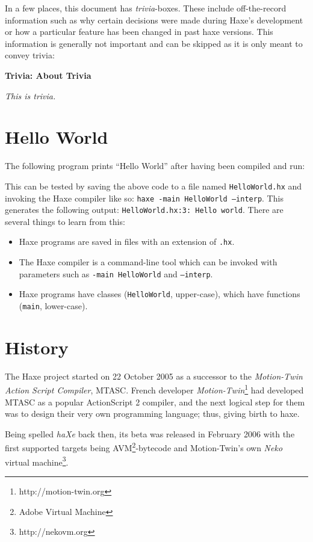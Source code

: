 \documentclass[a4paper,oneside]{book}
\newcommand{\type}[1]{\texttt{#1}}
\newcommand{\expr}[1]{\texttt{#1}}
\newenvironment{myshaded}
  {\def\FrameCommand{\fboxsep=\topsep\colorbox{bgcolor}}%
  \MakeFramed {\advance\hsize-\width \FrameRestore}}%
 {\endMakeFramed}
\newcommand{\trivia}[2]
	{\begin{myshaded}\noindent\textbf{Trivia: #1}\par\nobreak\noindent\ignorespaces\textit{#2}\end{myshaded}}
\newcommand{\ic}[1]{\texttt{#1}}
\newcommand{\haxe}[2][]{%
}
\begin{document}
In a few places, this document has \emph{trivia}-boxes. These include off-the-record information such as why certain decisions were made during Haxe's development or how a particular feature has been changed in past haxe versions. This information is generally not important and can be skipped as it is only meant to convey trivia:

\trivia{About Trivia}{This is trivia.}


\section{Hello World}
\label{introduction-hello-World}

The following program prints ``Hello World'' after having been compiled and run:

\haxe{assets/HelloWorld.hx}
This can be tested by saving the above code to a file named \ic{HelloWorld.hx} and invoking the Haxe compiler like so: \ic{haxe -main HelloWorld --interp}. This generates the following output: \ic{HelloWorld.hx:3: Hello world}. There are several things to learn from this:

\begin{itemize}
	\item Haxe programs are saved in files with an extension of \ic{.hx}.
	\item The Haxe compiler is a command-line tool which can be invoked with parameters such as \ic{-main HelloWorld} and \ic{--interp}.
	\item Haxe programs have classes (\type{HelloWorld}, upper-case), which have functions (\expr{main}, lower-case). 
\end{itemize}

\section{History}
\label{introduction-haxe-history}

The Haxe project started on 22 October 2005 as a successor to the \emph{Motion-Twin Action Script Compiler}, MTASC. French developer \emph{Motion-Twin}\footnote{http://motion-twin.org} had developed MTASC as a popular ActionScript 2 compiler, and the next logical step for them was to design their very own programming language; thus, giving birth to haxe.

Being spelled \emph{haXe} back then, its beta was released in February 2006 with the first supported targets being AVM\footnote{Adobe Virtual Machine}-bytecode and Motion-Twin's own \emph{Neko} virtual machine\footnote{http://nekovm.org}.
\end{document}

